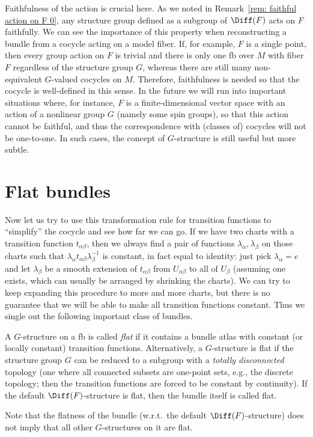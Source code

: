 \begin{rem}\label{rem: faithfulness of action on F}
    Faithfulness of the action is crucial here. As we noted in Remark~\ref{rem: faithful action on F 0}, any structure group defined as a subgroup of $\Diff(F)$ acts on $F$ faithfully. We can see the importance of this property when reconstructing a bundle from a cocycle acting on a model fiber. If, for example, $F$ is a single point, then every group action on $F$ is trivial and there is only one \gls{fb} over $M$ with fiber $F$ regardless of the structure group $G$, whereas there are still many non-equivalent $G$-valued cocycles on $M$. Therefore, faithfulness is needed so that the cocycle is well-defined in this sense. In the future we will run into important situations where, for instance, $F$ is a finite-dimensional vector space with an action of a nonlinear group $G$ (namely some spin groups), so that this action cannot be faithful, and thus the correspondence with (classes of) cocycles will not be one-to-one. In such cases, the concept of $G$-structure is still useful but more subtle.
\end{rem}






\section{Flat bundles}

Now let us try to use this transformation rule for transition functions to ``simplify'' the cocycle and see how far we can go. If we have two charts with a transition function $t_{\alpha\beta}$, then we always find a pair of functions $\lambda_\alpha,\lambda_\beta$ on those charts such that $\lambda_\alpha t_{\alpha\beta}\lambda_\beta^{-1}$ is constant, in fact equal to identity: just pick $\lambda_\alpha=e$ and let $\lambda_\beta$ be a smooth extension of $t_{\alpha\beta}$ from $U_{\alpha\beta}$ to all of $U_\beta$ (assuming one exists, which can usually be arranged by shrinking the charts). We can try to keep expanding this procedure to more and more charts, but there is no guarantee that we will be able to make all transition functions constant. Thus we single out the following important class of bundles.

\begin{defn}\label{def flat G-bundle}
	A $G$-structure on a \gls{fb} is called \emph{flat} if it contains a bundle atlas with constant (or locally constant) transition functions. Alternatively, a $G$-structure is flat if the structure group $G$ can be reduced to a subgroup with a \emph{totally disconnected} topology (one where all connected subsets are one-point sets, e.g., the discrete topology; then the transition functions are forced to be constant by continuity). If the default $\Diff(F)$-structure is flat, then the bundle itself is called flat.
\end{defn}
\begin{rem}
    Note that the flatness of the bundle (w.r.t.\ the default $\Diff(F)$-structure) does not imply that all other $G$-structures on it are flat.
\end{rem}


